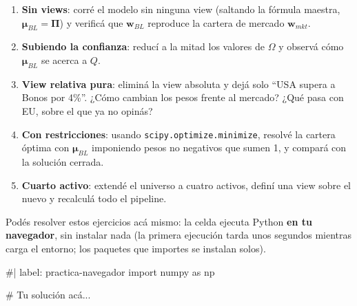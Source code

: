 \documentclass[
  spanish,
  letterpaper,
  DIV=11,
  numbers=noendperiod]{scrreprt}
\newenvironment{Shaded}{\begin{snugshade}}{\end{snugshade}}
\newcommand{\NormalTok}[1]{\textcolor[rgb]{0.00,0.23,0.31}{#1}}
\providecommand{\tightlist}{%
  \setlength{\itemsep}{0pt}\setlength{\parskip}{0pt}}
\begin{document}
\begin{tcolorbox}[enhanced jigsaw, bottomrule=.15mm, colback=white, opacitybacktitle=0.6, arc=.35mm, toprule=.15mm, opacityback=0, breakable, titlerule=0mm, left=2mm, coltitle=black, colbacktitle=quarto-callout-important-color!10!white, colframe=quarto-callout-important-color-frame, leftrule=.75mm, toptitle=1mm, bottomtitle=1mm, title=\textcolor{quarto-callout-important-color}{\faExclamation}\hspace{0.5em}{Ejercicios}, rightrule=.15mm]

\begin{enumerate}
\def\labelenumi{\arabic{enumi}.}
\tightlist
\item
  \textbf{Sin views}: corré el modelo sin ninguna view (saltando la
  fórmula maestra, \(\boldsymbol{\mu}_{BL} = \boldsymbol{\Pi}\)) y
  verificá que \(\mathbf{w}_{BL}\) reproduce la cartera de mercado
  \(\mathbf{w}_{mkt}\).
\item
  \textbf{Subiendo la confianza}: reducí a la mitad los valores de
  \(\Omega\) y observá cómo \(\boldsymbol{\mu}_{BL}\) se acerca a \(Q\).
\item
  \textbf{View relativa pura}: eliminá la view absoluta y dejá solo
  ``USA supera a Bonos por 4\%''. ¿Cómo cambian los pesos frente al
  mercado? ¿Qué pasa con EU, sobre el que ya no opinás?
\item
  \textbf{Con restricciones}: usando \texttt{scipy.optimize.minimize},
  resolvé la cartera óptima con \(\boldsymbol{\mu}_{BL}\) imponiendo
  pesos no negativos que sumen 1, y compará con la solución cerrada.
\item
  \textbf{Cuarto activo}: extendé el universo a cuatro activos, definí
  una view sobre el nuevo y recalculá todo el pipeline.
\end{enumerate}

\end{tcolorbox}

Podés resolver estos ejercicios acá mismo: la celda ejecuta Python
\textbf{en tu navegador}, sin instalar nada (la primera ejecución tarda
unos segundos mientras carga el entorno; los paquetes que importes se
instalan solos).

\begin{Shaded}
\begin{Highlighting}[]
\NormalTok{\#| label: practica{-}navegador}
\NormalTok{import numpy as np}

\NormalTok{\# Tu solución acá...}
\end{Highlighting}
\end{Shaded}
\end{document}
